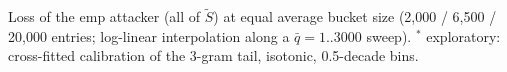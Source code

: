Loss of the emp attacker (all of $\tilde S$) at equal average bucket size (2,000 / 6,500 / 20,000 entries; log-linear interpolation along a $\bar q=1..3000$ sweep). $^{\ast}$ exploratory: cross-fitted calibration of the 3-gram tail, isotonic, 0.5-decade bins.
